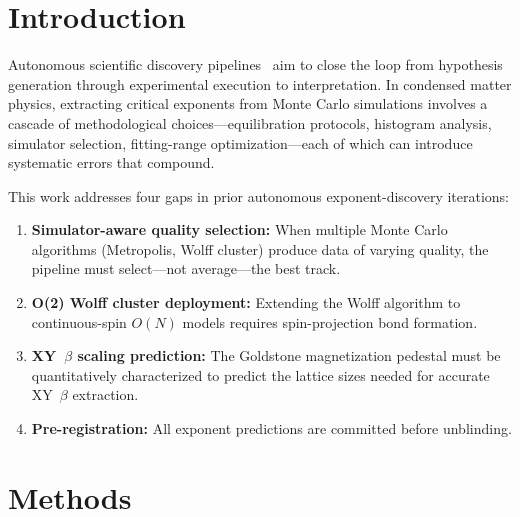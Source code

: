 \documentclass[11pt,a4paper]{article}
\begin{document}
\begin{abstract}
\medskip\noindent
\textbf{Keywords:} critical exponents, finite-size scaling, Monte Carlo, Wolff cluster algorithm, WHAM, autonomous discovery, Goldstone modes, O(2) universality.
\end{abstract}

\tableofcontents

\section{Introduction}\label{sec:intro}

Autonomous scientific discovery pipelines~\cite{king2009,krenn2022} aim to close the loop from hypothesis generation through experimental execution to interpretation. In condensed matter physics, extracting critical exponents from Monte Carlo simulations involves a cascade of methodological choices---equilibration protocols, histogram analysis, simulator selection, fitting-range optimization---each of which can introduce systematic errors that compound.

This work addresses four gaps in prior autonomous exponent-discovery iterations:
\begin{enumerate}
  \item \textbf{Simulator-aware quality selection:} When multiple Monte Carlo algorithms (Metropolis, Wolff cluster) produce data of varying quality, the pipeline must select---not average---the best track.
  \item \textbf{O(2) Wolff cluster deployment:} Extending the Wolff algorithm to continuous-spin $O(N)$ models requires spin-projection bond formation.
  \item \textbf{XY~$\beta$ scaling prediction:} The Goldstone magnetization pedestal must be quantitatively characterized to predict the lattice sizes needed for accurate XY~$\beta$ extraction.
  \item \textbf{Pre-registration:} All exponent predictions are committed before unblinding.
\end{enumerate}

\section{Methods}\label{sec:methods}
\end{document}
